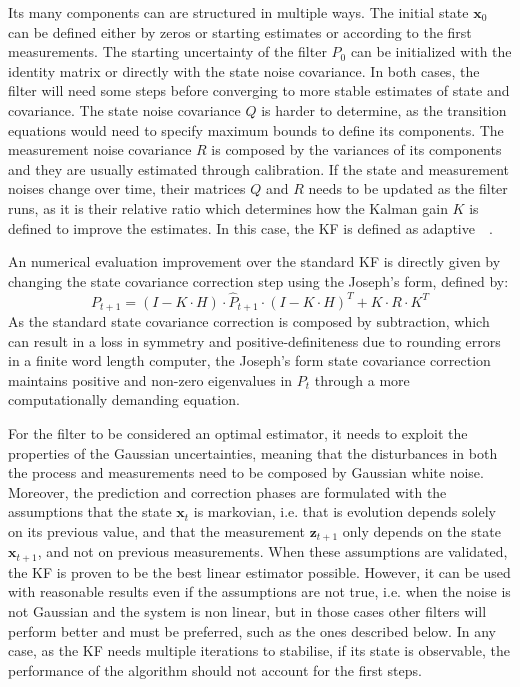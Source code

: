 Its many components can are structured in multiple ways.
The initial state $\mathbf{x}_{0}$ can be defined either by zeros or starting estimates or according to the first measurements.
The starting uncertainty of the filter $P_0$ can be initialized with the identity matrix or directly with the state noise covariance. In both cases, the filter will need some steps before converging to more stable estimates of state and covariance.
The state noise covariance $Q$ is harder to determine, as the transition equations would need to specify maximum bounds to define its components.
The measurement noise covariance $R$ is composed by the variances of its components and they are usually estimated through calibration.
If the state and measurement noises change over time, their matrices $Q$ and $R$ needs to be updated as the filter runs, as it is their relative ratio which determines how the Kalman gain $K$ is defined to improve the estimates. In this case, the \gls{KF} is defined as adaptive~\cite{adaptive}~\cite{1099422}.


An numerical evaluation improvement over the standard \gls{KF} is directly given by changing the state covariance correction step using the Joseph’s form\cite{schmidt_analysis_2010}, defined by:
\begin{equation}
    P_{t+1} = (I - K \cdot H) \cdot \hat{P}_{t+1} \cdot (I - K \cdot H)^T + K \cdot R \cdot K^T
\end{equation}
As the standard state covariance correction is composed by subtraction, which can result in a loss in symmetry and positive-definiteness due to rounding errors in a finite word length computer, the Joseph’s form state covariance correction maintains positive and non-zero eigenvalues in $P_t$ through a more computationally demanding equation\cite{BarShalom2001EstimationWA}.

For the filter to be considered an optimal estimator, it needs to exploit the properties of the Gaussian uncertainties, meaning that the disturbances in both the process and measurements need to be composed by Gaussian white noise.
Moreover, the prediction and correction phases are formulated with the assumptions that the state $\mathbf{x}_t$ is markovian, i.e. that is evolution depends solely on its previous value, and that the measurement $\mathbf{z}_{t+1}$ only depends on the state $\mathbf{x}_{t+1}$, and not on previous measurements.
When these assumptions are validated, the \gls{KF} is proven to be the best linear estimator possible.
However, it can be used with reasonable results even if the assumptions are not true, i.e. when the noise is not Gaussian and the system is non linear, but in those cases other filters will perform better and must be preferred, such as the ones described below.
In any case, as the \gls{KF} needs multiple iterations to stabilise, if its state is observable, the performance of the algorithm should not account for the first steps.


